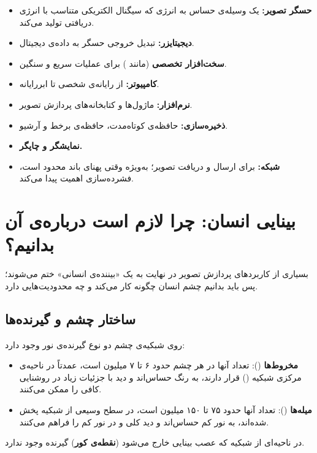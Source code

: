 \documentclass[11pt,a4paper]{article}
\begin{document}
	\begin{itemize}
		\item \textbf{حسگر تصویر:} یک وسیله‌ی حساس به انرژی که سیگنال الکتریکی متناسب با انرژی دریافتی تولید می‌کند.
		\item \textbf{دیجیتایزر:} تبدیل خروجی حسگر به داده‌ی دیجیتال.
		\item \textbf{سخت‌افزار تخصصی} (مانند ) برای عملیات سریع و سنگین.
		\item \textbf{کامپیوتر:} از رایانه‌ی شخصی تا ابررایانه.
		\item \textbf{نرم‌افزار:} ماژول‌ها و کتابخانه‌های پردازش تصویر.
		\item \textbf{ذخیره‌سازی:} حافظه‌ی کوتاه‌مدت، حافظه‌ی برخط و آرشیو.
		\item \textbf{نمایشگر و چاپگر.}
		\item \textbf{شبکه:} برای ارسال و دریافت تصویر؛ به‌ویژه وقتی پهنای باند محدود است، فشرده‌سازی اهمیت پیدا می‌کند.
	\end{itemize}
	
	
	\section{بینایی انسان: چرا لازم است درباره‌ی آن بدانیم؟}
	
	بسیاری از کاربردهای پردازش تصویر در نهایت به یک «بیننده‌ی انسانی» ختم می‌شوند؛
	پس باید بدانیم چشم انسان چگونه کار می‌کند و چه محدودیت‌هایی دارد.
	
	\subsection{ساختار چشم و گیرنده‌ها}
	
	روی شبکیه‌ی چشم دو نوع گیرنده‌ی نور وجود دارد:
	
	\begin{itemize}
		\item \textbf{مخروط‌ها} (): تعداد آنها در هر چشم حدود ۶ تا ۷ میلیون است،
		عمدتاً در ناحیه‌ی مرکزی شبکیه () قرار دارند، به رنگ حساس‌اند
		و دید با جزئیات زیاد در روشنایی کافی را ممکن می‌کنند.
		\item \textbf{میله‌ها} (): تعداد آنها حدود ۷۵ تا ۱۵۰ میلیون است،
		در سطح وسیعی از شبکیه پخش شده‌اند، به نور کم حساس‌اند و دید کلی و در نور کم را فراهم می‌کنند.
	\end{itemize}
	
	در ناحیه‌ای از شبکیه که عصب بینایی خارج می‌شود (\textbf{نقطه‌ی کور}) گیرنده وجود ندارد.
	
\end{document}
